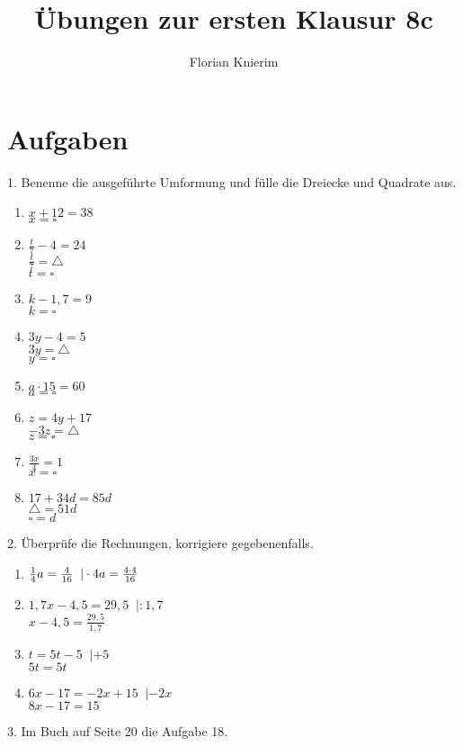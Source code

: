 \documentclass[11pt,a4paper]{scrartcl}
\begin{document}
\pagestyle{fancy}
\title{Übungen zur ersten Klausur 8c}
\author{Florian Knierim}


\section*{Aufgaben}\vspace{-1em}
1. Benenne die ausgeführte Umformung und fülle die Dreiecke und Quadrate aus.
\begin{multicols}{4}
	\begin{enumerate}[label=\alph*)] 
		\item $x+12 = 38 $\\ 		$x = \square $
		\item $\frac{t}{7}-4 = 24$\\ $\frac{t}{7} = \triangle$\\ $t = \square$
		\item $k-1,7 = 9$\\ 		$k = \square $
		\item $3y -4 = 5$\\ $3y = \triangle $\\ $y = \square$
		\item $a\cdot 15 = 60 $\\	$a = \square $
		\item $z= 4y+17$\\$-3z=\triangle$\\$z = \square$
		\item $\frac{3x}{4} = 1$\\	$x= \square $
		\item $17+34d = 85d$\\ $\triangle = 51d$\\ $\square = d$
	\end{enumerate}
\end{multicols}

2. Überprüfe die Rechnungen, korrigiere gegebenenfalls.
\begin{multicols}{2}
	\begin{enumerate}[label=\alph*)] 
		\item $\frac{1}{4}a = \frac{4}{16} \;\;|\cdot 4\\ a = \frac{4\cdot4}{16}$
		\item $1,7x -4,5 = 29,5 \;\;|:1,7$\\ $x-4,5 = \frac{29,5}{1,7}$
		\item $ t = 5t -5 \;\;|+5$\\ $5t = 5t$
		\item $6x-17 = -2x+15\;\;|-2x$\\ $8x -17 = 15$
	\end{enumerate}
\end{multicols}
3. Im Buch auf Seite 20 die Aufgabe 18.
\end{document}
